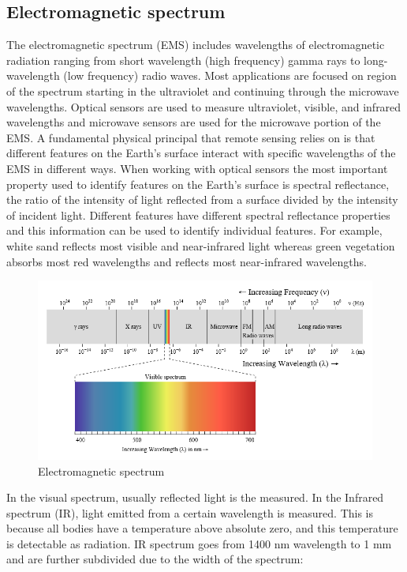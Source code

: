     \subsection{Electromagnetic spectrum}

    The electromagnetic spectrum (EMS) includes wavelengths of electromagnetic radiation ranging from short wavelength (high frequency) gamma rays to long-wavelength (low frequency) radio waves. 
    Most applications are focused on region of the spectrum starting in the ultraviolet and continuing through the microwave wavelengths. 
    Optical sensors are used to measure ultraviolet, visible, and infrared wavelengths and microwave sensors are used for the microwave portion of the EMS.
    A fundamental physical principal that remote sensing relies on is that different features on the Earth's surface interact with specific wavelengths of the EMS in different ways.
    When working with optical sensors the most important property used to identify features on the Earth's surface is spectral reflectance, the ratio of the intensity of light reflected from a surface divided by the intensity of incident light.
    Different features have different spectral reflectance properties and this information can be used to identify individual features.
    For example, white sand reflects most visible and near-infrared light whereas green vegetation absorbs most red wavelengths and reflects most near-infrared wavelengths.    

    \begin{figure}[H]
        \centering
        \includegraphics[width=\textwidth]{Includes/1-electromagnetic-spectrum.png}
        \caption{Electromagnetic spectrum}
        \label{fig:1-electromagnetic-spectrum}
    \end{figure}

    In the visual spectrum, usually reflected light is the measured. 
    In the Infrared spectrum (IR), light emitted from a certain wavelength is measured.
    This is because all bodies have a temperature above absolute zero, and this temperature is detectable as radiation.
    IR spectrum goes from 1400 nm wavelength to 1 mm and are further subdivided due to the width of the spectrum:

